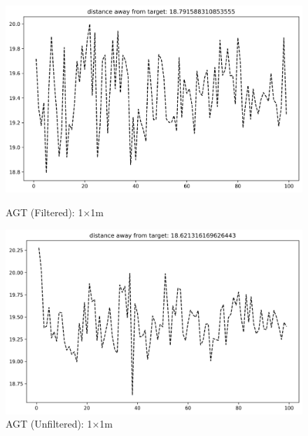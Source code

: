 \documentclass[runningheads]{llncs}
\begin{document}
\begin{figure}[H]
	\centering
	\begin{minipage}{0.49\textwidth}
		\centering
		\includegraphics[width=\textwidth]{figures/filtered/xgbrf_custom_1.png}
		\caption*{AGT (Filtered): 1×1m}
	\end{minipage}
	\hfill
	\begin{minipage}{0.49\textwidth}
		\centering
		\includegraphics[width=\textwidth]{figures/unfiltered/xgbrf_custom_1.png}
		\caption*{AGT (Unfiltered): 1×1m}
	\end{minipage}
\end{figure}
\end{document}
